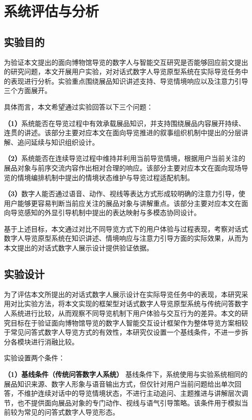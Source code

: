 \section{系统评估与分析}

\subsection{实验目的}
为验证本文提出的面向博物馆导览的数字人与智能交互研究是否能够回应前文提出的研究问题，本文开展用户实验，对对话式数字人导览原型系统在实际导览任务中的表现进行分析。实验重点围绕展品知识讲述支持、导览情境响应以及注意力引导三个方面展开。

具体而言，本文希望通过实验回答以下三个问题：

\textbf{（1）}系统能否在导览过程中有效承载展品知识，并支持围绕展品内容展开持续、连贯的讲述。该部分主要对应本文在面向导览推进的叙事组织机制中提出的分层讲解、追问延续与知识组织设计。

\textbf{（2）}系统能否在连续导览过程中维持并利用当前导览情境，根据用户当前关注的展品对象与前序交流内容作出相对合理的响应。该部分主要对应本文在面向现场导览的情境编排机制中提出的情境状态维护与导览过程适配机制。

\textbf{（3）}数字人能否通过语音、动作、视线等表达方式形成较明确的注意力引导，使用户能够更容易判断当前应关注的展品对象与讲解重点。该部分主要对应本文在面向导览感知的外显引导机制中提出的表达映射与多模态协同设计。

基于上述目标，本文通过对比不同导览方式下的用户体验与过程表现，考察对话式数字人导览原型系统在知识讲述、情境响应与注意力引导方面的实际效果，从而为本文提出的对话式数字人展示设计提供验证依据。

\subsection{实验设计}
为了评估本文所提出的对话式数字人展示设计在实际导览任务中的表现，本研究采用对比实验方法，将本文实现的框架型对话式数字人导览原型系统与传统问答数字人系统进行比较，从而观察不同导览机制下用户体验与交互行为的差异。本文的研究目标在于验证面向博物馆导览的数字人智能交互设计框架作为整体导览方案相较于常见问答式数字人导览方式的有效性，本研究仅设置一个基线条件，不进一步拆分各模块进行消融比较。

实验设置两个条件：

\textbf{（1）基线条件（传统问答数字人系统）}
基线条件下，系统使用与实验系统相同的展品知识来源、数字人形象与语音输出方式，但仅针对用户当前问题给出单次回答，不维护连续对话中的导览情境状态，不进行主动追问、主题推进与讲解层次调节，也不提供面向展品对象的专门动作、视线与语气引导策略。该条件用于模拟当前较为常见的问答式数字人导览形态。


